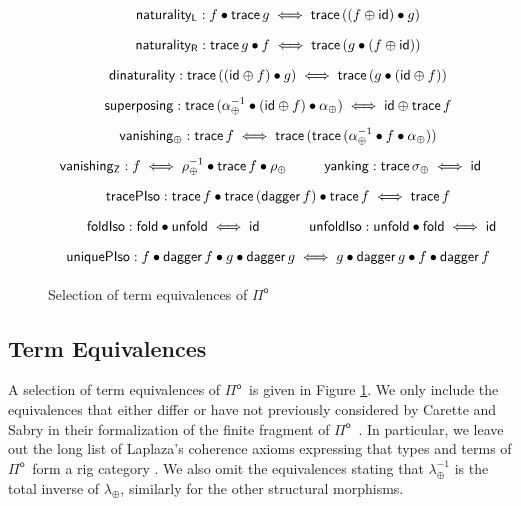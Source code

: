 \documentclass[runningheads,a4paper]{llncs}
\newcommand{\Pio}{\ensuremath{\mathsf{\Pi}^{\mathsf{o}}}}
\newcommand{\id}{\mathsf{id}}
\newcommand{\fold}{\mathsf{fold}}
\newcommand{\unfold}{\mathsf{unfold}}
\newcommand{\trace}{\ensuremath{\mathsf{trace}}}
\newcommand{\Z}{\mathsf{Z}}
\newcommand{\LR}{\iff}
\renewcommand{\dagger}{\mathsf{dagger}}
\begin{document}
\begin{figure}[t]
\[
\arraycolsep=8pt\def\arraystretch{1.8}
\begin{array}{cc} %
\multicolumn{2}{c}{\mathsf{naturality_L} : f \bullet \trace\,g \LR \trace\,((f \oplus
  \id) \bullet g)} \\ 
\multicolumn{2}{c}{\mathsf{naturality_R} : \trace\,g \bullet f \LR \trace\,(g \bullet (f 
  \oplus \id))} \\  
\multicolumn{2}{c}{\mathsf{dinaturality} : \trace \,((\id \oplus f) \bullet g) \LR \trace
  \,(g \bullet (\id \oplus f))} \\
\multicolumn{2}{c}{\mathsf{superposing} : \trace \,(\alpha_\oplus^{-1}
  \bullet (\id \oplus f) \bullet \alpha_\oplus) \LR \id \oplus \trace \,f} \\ 
\multicolumn{2}{c}{\mathsf{vanishing_\oplus} : \trace \,f \LR \trace \,(\trace
  \,(\alpha_\oplus^{-1} \bullet f \bullet \alpha_\oplus))} \\ 
\mathsf{vanishing_\Z} : f \LR \rho_\oplus^{-1} \bullet \trace \,f
  \bullet \rho_\oplus 
&
\mathsf{yanking} : \trace\, \sigma_\oplus \LR \id
 \\
\multicolumn{2}{c}{\mathsf{tracePIso} : \trace\,f \bullet \trace\,(\dagger\,f)
  \bullet \trace\,f \LR \trace \,f} \\
\mathsf{foldIso} : \fold \bullet \unfold \LR \id 
&
\mathsf{unfoldIso} : \unfold \bullet \fold \LR \id
\\
\multicolumn{2}{c}{\mathsf{uniquePIso} : f \bullet \dagger \,f
  \bullet g \bullet \dagger \, g \LR g \bullet \dagger \,g
  \bullet f \bullet \dagger \, f}
\end{array}
\]
\caption{Selection of term equivalences of \Pio}
\label{fig:programequivs}
\end{figure}

\subsection{Term Equivalences}

A selection of term equivalences of \Pio\ is given in Figure
\ref{fig:programequivs}. We only include the equivalences that either
differ or have not previously considered by Carette and Sabry in their
formalization of the finite fragment of \Pio~\cite{CaretteS16}. In
particular, we leave out the long list of Laplaza's coherence axioms
expressing that types and terms of \Pio\ form a rig category \cite{Laplaza}.
We also omit the equivalences stating that $\lambda_\oplus^{-1}$ is
the total inverse of $\lambda_\oplus$, similarly for the other
structural morphisms. 
\end{document}
